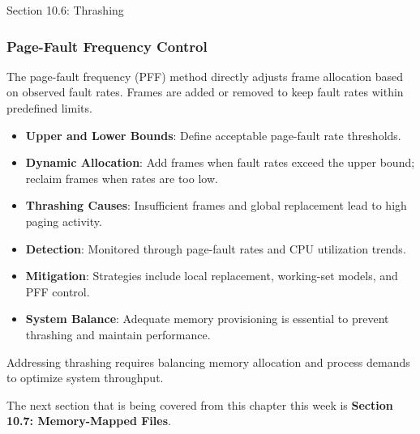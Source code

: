 \begin{notes}{Section 10.6: Thrashing}
    \subsubsection*{Page-Fault Frequency Control}
    
    The page-fault frequency (PFF) method directly adjusts frame allocation based on observed fault rates. Frames are added or removed to keep fault rates within predefined limits.
    
    \begin{highlight}
        \begin{itemize}
            \item \textbf{Upper and Lower Bounds}: Define acceptable page-fault rate thresholds.
            \item \textbf{Dynamic Allocation}: Add frames when fault rates exceed the upper bound; reclaim frames when rates are too low.
        \end{itemize}
    \end{highlight}
    
    \begin{highlight}
        \begin{itemize}
            \item \textbf{Thrashing Causes}: Insufficient frames and global replacement lead to high paging activity.
            \item \textbf{Detection}: Monitored through page-fault rates and CPU utilization trends.
            \item \textbf{Mitigation}: Strategies include local replacement, working-set models, and PFF control.
            \item \textbf{System Balance}: Adequate memory provisioning is essential to prevent thrashing and maintain performance.
        \end{itemize}
        Addressing thrashing requires balancing memory allocation and process demands to optimize system throughput.
    \end{highlight}
\end{notes}

The next section that is being covered from this chapter this week is \textbf{Section 10.7: Memory-Mapped Files}.

